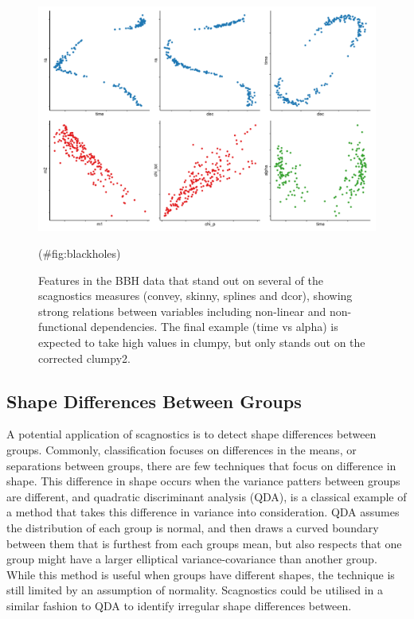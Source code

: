 \begin{Schunk}
\begin{figure}
\includegraphics[width=1\linewidth]{mason-lee-laa-cook_files/figure-latex/blackholes-1} \caption[Features in the BBH data that stand out on several of the scagnostics measures (convey, skinny, splines and dcor), showing strong relations between variables including non-linear and non-functional dependencies]{Features in the BBH data that stand out on several of the scagnostics measures (convey, skinny, splines and dcor), showing strong relations between variables including non-linear and non-functional dependencies. The final example (time vs alpha) is expected to take high values in clumpy, but only stands out on the corrected clumpy2.}(\#fig:blackholes)
\end{figure}
\end{Schunk}

\hypertarget{shape-differences-between-groups}{%
\subsection{Shape Differences Between
Groups}\label{shape-differences-between-groups}}

A potential application of scagnostics is to detect shape differences
between groups. Commonly, classification focuses on differences in the
means, or separations between groups, there are few techniques that
focus on difference in shape. This difference in shape occurs when the
variance patters between groups are different, and quadratic
discriminant analysis (QDA), is a classical example of a method that
takes this difference in variance into consideration. QDA assumes the
distribution of each group is normal, and then draws a curved boundary
between them that is furthest from each groups mean, but also respects
that one group might have a larger elliptical variance-covariance than
another group. While this method is useful when groups have different
shapes, the technique is still limited by an assumption of normality.
Scagnostics could be utilised in a similar fashion to QDA to identify
irregular shape differences between.

